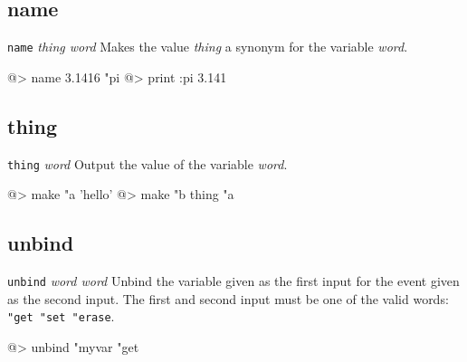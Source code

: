 \subsection*{name}  
 
{\tt name} {\it thing word} 
\newline\newline
Makes the value {\it thing} a synonym for the variable {\it word}.
\begin{verbatimtab} 
@> name 3.1416 "pi
@> print :pi
3.141
\end{verbatimtab}
 
\subsection*{thing}  
 
{\tt thing} {\it word} 
\newline\newline
Output the value of the variable {\it word}.
\begin{verbatimtab} 
@> make "a 'hello'
@> make "b thing "a
\end{verbatimtab}

\subsection*{unbind}  
 
{\tt unbind} {\it word word} 
\newline\newline
Unbind the variable given as the first input for the event given as the second input.  The first and second input must be one of the valid words: {\tt "get "set "erase}.
\begin{verbatimtab} 
@> unbind "myvar "get
\end{verbatimtab}
